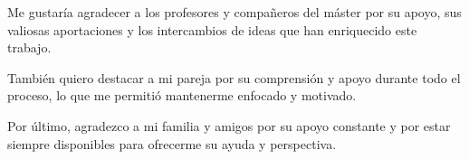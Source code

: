 \cleardoublepage
{}
\vspace{15ex}

Me gustaría agradecer a los profesores y compañeros del máster por su apoyo, sus valiosas aportaciones y los intercambios de ideas que han enriquecido este trabajo.

\medskip
También quiero destacar a mi pareja por su comprensión y apoyo durante todo el proceso, lo que me permitió mantenerme enfocado y motivado.

\medskip
Por último, agradezco a mi familia y amigos por su apoyo constante y por estar siempre disponibles para ofrecerme su ayuda y perspectiva.
